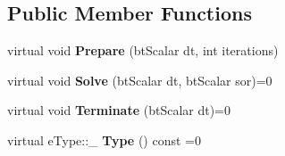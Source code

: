 \subsection*{Public Member Functions}
\begin{DoxyCompactItemize}
\item 
\mbox{\label{structbtSoftBody_1_1Joint_acde4b979f83417395c2b534d450077c5}} 
virtual void {\bfseries Prepare} (bt\+Scalar dt, int iterations)
\item 
\mbox{\label{structbtSoftBody_1_1Joint_a4945523933c9f51e2d65321579192a54}} 
virtual void {\bfseries Solve} (bt\+Scalar dt, bt\+Scalar sor)=0
\item 
\mbox{\label{structbtSoftBody_1_1Joint_a99c5a0d847dbdc5fd9bd8cade288482f}} 
virtual void {\bfseries Terminate} (bt\+Scalar dt)=0
\item 
\mbox{\label{structbtSoftBody_1_1Joint_ae2c4301272e3e9aae0e84431cd4059f9}} 
virtual e\+Type\+::\+\_\+ {\bfseries Type} () const =0
\end{DoxyCompactItemize}
